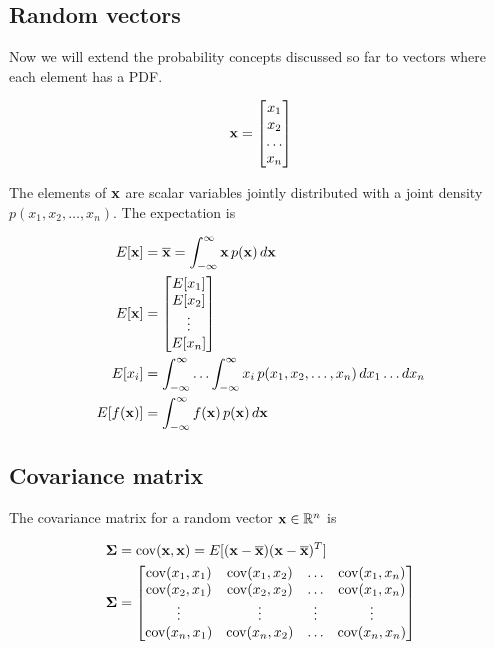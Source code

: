 \subsection{Random vectors}

Now we will extend the probability concepts discussed so far to vectors where
each element has a PDF.

\begin{equation*}
  \mathbf{x} = \begin{bmatrix}
    x_1 \\
    x_2 \\
    \ldots \\
    x_n
  \end{bmatrix}
\end{equation*}

The elements of $\mathbf{x}$ are scalar variables jointly distributed with a joint
density $p(x_1, x_2, \ldots, x_n)$. The expectation is

\begin{align*}
  E[\mathbf{x}] &= \overline{\mathbf{x}} = \int_{-\infty}^\infty \mathbf{x} \,p(\mathbf{x})
    \,d\mathbf{x} \\
  E[\mathbf{x}] &= \begin{bmatrix}
    E[x_1] \\
    E[x_2] \\
    \vdots \\
    E[x_n]
  \end{bmatrix} \\
  E[x_i] &= \int_{-\infty}^\infty \ldots \int_{-\infty}^\infty x_i
    \,p(x_1, x_2, \ldots, x_n) \,dx_1 \ldots dx_n \\
  E[f(\mathbf{x})] &= \int_{-\infty}^\infty f(\mathbf{x}) \,p(\mathbf{x}) \,d\mathbf{x}
\end{align*}

\subsection{Covariance matrix}

The covariance matrix for a random vector $\mathbf{x} \in \mathbb{R}^n$ is

\begin{align*}
  \mathbf{\Sigma} &= \operatorname{cov}(\mathbf{x}, \mathbf{x}) = E[(\mathbf{x} - \overline{\mathbf{x}})
    (\mathbf{x} - \overline{\mathbf{x}})^T] \\
  \mathbf{\Sigma} &= \begin{bmatrix}
    \operatorname{cov}(x_1, x_1) & \operatorname{cov}(x_1, x_2) & \ldots & \operatorname{cov}(x_1, x_n) \\
    \operatorname{cov}(x_2, x_1) & \operatorname{cov}(x_2, x_2) & \ldots & \operatorname{cov}(x_1, x_n) \\
    \vdots        & \vdots        & \vdots & \vdots \\
    \operatorname{cov}(x_n, x_1) & \operatorname{cov}(x_n, x_2) & \ldots & \operatorname{cov}(x_n, x_n) \\
  \end{bmatrix}
\end{align*}

